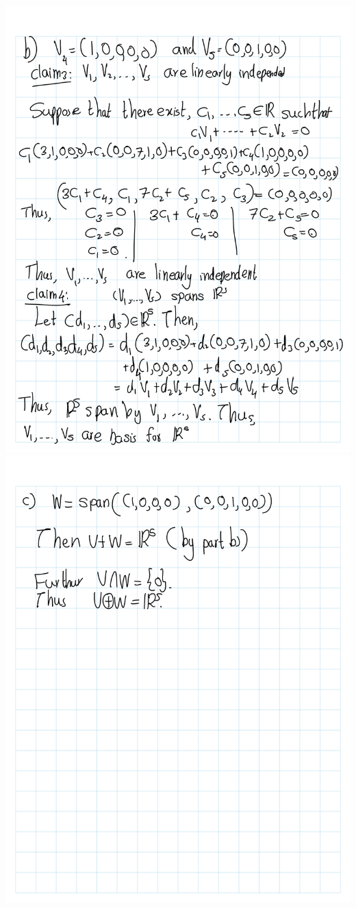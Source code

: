 \documentclass[
]{book}
\theoremstyle{definition}
\theoremstyle{definition}
\theoremstyle{definition}
\theoremstyle{definition}
\theoremstyle{remark}
\begin{document}
\includegraphics{fig/Ex 2B and 2C/EX2B (7).png}
\includegraphics{fig/Ex 2B and 2C/EX2B (8).png}
\end{document}
